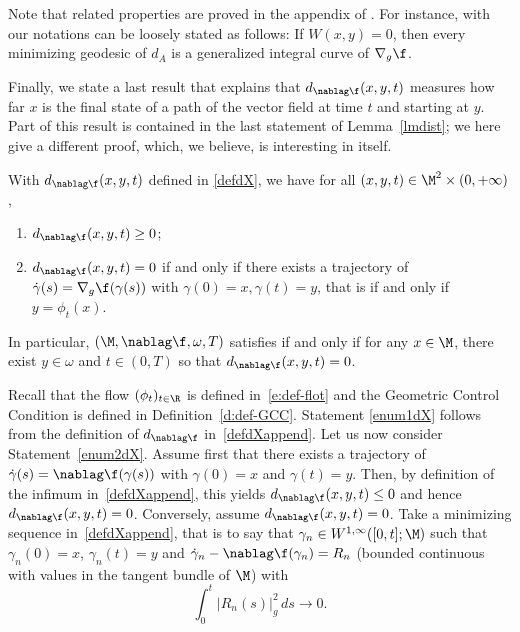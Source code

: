 Note that related properties are proved in the appendix of \cite{HS:85}. For instance, \cite[Lem.\,A2.2]{HS:85} with our notations can be loosely stated as follows:
If $W(x,y)=0$, then every minimizing geodesic of $d_{A}$ is a generalized integral curve of $\nabla_g \f$.

Finally, we state a last result that explains that $d_{\nablag \f}(x,y,t)$ measures how far $x$ is the final state of a path of the vector field at time $t$ and starting at $y$.
Part of this result is contained in the last statement of Lemma~\ref{lmdist}; we here give a different proof, which, we believe, is interesting in itself.\enlargethispage{-2\baselineskip}%
\begin{proposition}
\label{propdX}
With $d_{\nablag \f}(x,y,t)$ defined in \eqref{defdX}, we have for all $(x,y,t) \in \M^2\times (0,+\infty)$,
\begin{enumerate}
\item \label{enum1dX}$d_{\nablag \f}(x,y,t)\geq 0$;
\item \label{enum2dX}$d_{\nablag \f}(x,y,t)=0$ if and only if there exists a trajectory of $\dot{\gamma}(s)=\nabla_g\f(\gamma(s))$ with $\gamma(0)=x, \gamma(t)= y$, that is if and only if $y=\phi_t(x)$.
\end{enumerate}
In particular, $(\M,\nablag\f,\omega,T)$ satisfies \pGCC if and only if for any $x\in \M$, there exist $y\in \omega$ and $t\in (0,T)$ so that $d_{\nablag \f}(x,y,t)=0$.
\end{proposition}
Recall that the flow $(\phi_t)_{t\in \R}$ is defined in~\eqref{e:def-flot} and the Geometric Control Condition \pGCC is defined in Definition~\ref{d:def-GCC}.
\bnp
Statement \ref{enum1dX} follows from the definition of $d_{\nablag \f}$ in~\eqref{defdXappend}.
Let us now consider Statement~\eqref{enum2dX}.
Assume first that there exists a trajectory of $\dot{\gamma}(s)=\nablag\f(\gamma(s))$ with $\gamma(0)=x$ and $\gamma(t)=y$. Then, by definition of the infimum in~\eqref{defdXappend}, this yields $d_{\nablag \f}(x,y,t)\leq 0$ and hence $d_{\nablag \f}(x,y,t)=0$. Conversely, assume $d_{\nablag \f}(x,y,t)=0$. Take a minimizing sequence in~\eqref{defdXappend}, that is to say that $\gamma_n \in W^{1,\infty}([0,t]; \M)$ such that $\gamma_n(0)=x$, $\gamma_n(t)=y$ and $\dot{\gamma}_n-\nablag\f (\gamma_n)=R_n$ (bounded continuous with values in the tangent bundle of $\M$) with
\begin{equation}
\label{e:Rn-to-zer}
\int_0^t |R_n(s)|_g^2\, ds \to 0.
\end{equation}
